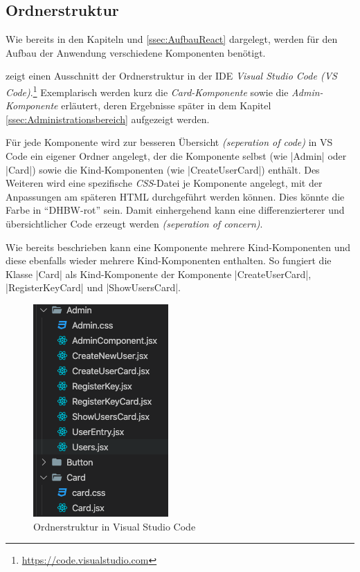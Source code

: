 
\subsection{Ordnerstruktur}
\label{ssec:Ordnerstruktur}

Wie bereits in den Kapiteln  und \vref{ssec:AufbauReact} dargelegt, werden für den Aufbau der Anwendung verschiedene Komponenten benötigt. 

\abb {} zeigt einen Ausschnitt der Ordnerstruktur in der \ac{IDE} \emph{Visual Studio Code (VS Code)}.\footnote{\url{https://code.visualstudio.com}}
Exemplarisch werden kurz die \emph{Card-Komponente} sowie die \emph{Admin-Komponente} erläutert, deren Ergebnisse später \ua in dem Kapitel \vref{ssec:Administrationsbereich} aufgezeigt werden.

Für jede Komponente wird \ua zur besseren Übersicht \emph{(seperation of code)} in VS Code ein eigener Ordner angelegt, der die Komponente selbst (wie \zb \jinline|Admin| oder \jinline|Card|) sowie die Kind-Komponenten (wie \zb \jinline|CreateUserCard|) enthält.  
Des Weiteren wird eine spezifische \emph{\acs{CSS}}-Datei je Komponente angelegt, mit der Anpassungen am späteren \ac{HTML} durchgeführt werden können. 
Dies könnte \zb die Farbe in \enquote{DHBW-rot} sein. 
Damit einhergehend kann eine differenzierterer und übersichtlicher Code erzeugt werden \emph{(seperation of concern)}.

Wie bereits beschrieben kann eine Komponente mehrere Kind-Komponenten und diese ebenfalls wieder mehrere Kind-Komponenten enthalten. 
So fungiert die Klasse \jinline|Card| \ua als Kind-Komponente der Komponente \jinline|CreateUserCard|, \jinline|RegisterKeyCard| und \jinline|ShowUsersCard|. 

\begin{figure}[!htb]
	\centering
	\includegraphics[height=0.4\textwidth, keepaspectratio]{img/client/ordnerStruktur.png}
	\captionsetup{justification=centering, format=plain}
	\caption[Ordnerstruktur in Visual Studio Code]{Ordnerstruktur in Visual Studio Code \\ \quelleScreenshot}
	\label{fig:OrdnerstrukturVSCode}
\end{figure}
